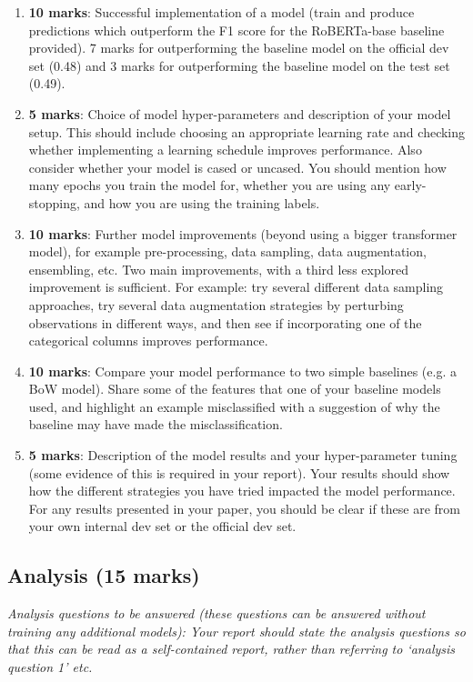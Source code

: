 \documentclass[11pt]{article}
\begin{document}
\begin{enumerate}
    \item \textbf{10 marks}: Successful implementation of a model (train and produce predictions which outperform the F1 score for the RoBERTa-base baseline provided). 7 marks for outperforming the baseline model on the official dev set (0.48) and 3 marks for outperforming the baseline model on the test set (0.49).
    \item \textbf{5 marks}: Choice of model hyper-parameters and description of your model setup. This should include choosing an appropriate learning rate and checking whether implementing a learning schedule improves performance. Also consider whether your model is cased or uncased. You should mention how many epochs you train the model for, whether you are using any early-stopping, and how you are using the training labels.
    \item \textbf{10 marks}: Further model improvements (beyond using a bigger transformer model), for example pre-processing, data sampling, data augmentation, ensembling, etc. Two main improvements, with a third less explored improvement is sufficient. For example: try several different data sampling approaches, try several data augmentation strategies by perturbing observations in different ways, and then see if incorporating one of the categorical columns improves performance.
    \item \textbf{10 marks}: Compare your model performance to two simple baselines (e.g. a BoW model). Share some of the features that one of your baseline models used, and highlight an example misclassified with a suggestion of why the baseline may have made the misclassification.
    \item \textbf{5 marks}: Description of the model results and your hyper-parameter tuning (some evidence of this is required in your report). Your results should show how the different strategies you have tried impacted the model performance. For any results presented in your paper, you should be clear if these are from your own internal dev set or the official dev set.
\end{enumerate}

\subsection{Analysis \textbf{(15 marks)}}

\emph{Analysis questions to be answered (these questions can be answered without training any additional models): Your report should state the analysis questions so that this can be read as a self-contained report, rather than referring to ‘analysis question 1’ etc.}
\end{document}
